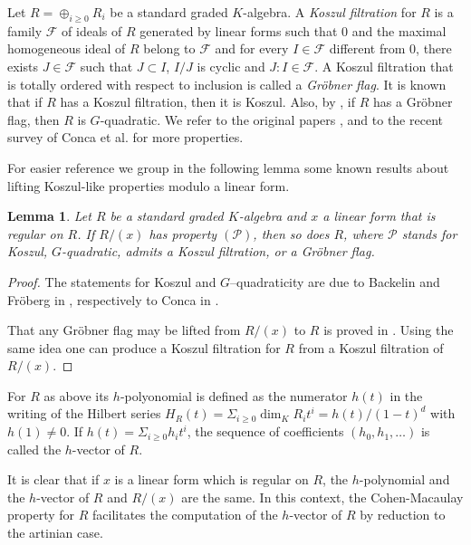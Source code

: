 \documentclass[12pt]{amsart}
\newtheorem{Lemma}[Theorem]{Lemma}
\begin{document}
Let $R=\oplus_{i\geq 0} R_i$  be a  standard graded $K$-algebra.
A {\em Koszul filtration}  for $R$  is a family $\mathcal{F}$ of ideals of $R$ generated by linear forms such that $0$ and 
the maximal homogeneous ideal of $R$ belong to $\mathcal{F}$ and for every $I\in \mathcal{F}$ different from $0$, there exists $J \in \mathcal{F}$ such that
$J\subset I$, $I/J$ is cyclic and $J:I \in \mathcal{F}$. A Koszul filtration that is totally ordered with respect to inclusion is called a {\em Gr\"obner flag}.
It is known that if $R$ has a Koszul filtration, then it is Koszul. Also, by \cite[Theorem 2.4]{CRV}, if $R$ has a Gr\"obner flag, then $R$ is $G$-quadratic.
We refer to the original papers  \cite{CTV}, \cite{CRV} and to the recent survey \cite{CdNR} of Conca et al.  for more properties.

For easier reference we group in the following lemma some known results about lifting Koszul-like properties modulo a linear form. 

\begin{Lemma}
\label{lemma:lifting}
Let $R$ be a standard graded $K$-algebra and $x$ a linear form that is regular on $R$. If $R/(x)$ has  property $(\mathcal{P})$, then so does $R$, where
$\mathcal{P}$ stands for Koszul, $G$-quadratic, admits a Koszul filtration, or a Gr\"obner flag.  
\end{Lemma}

\begin{proof} The statements for Koszul and $G$--quadraticity are due to Backelin and Fr\"oberg in \cite[Lemma 2]{BF-poincare}, respectively to Conca in 
\cite[Lemma 4.(2)]{Conca-quadrics}. 

That any Gr\"obner flag may be lifted from $R/(x)$ to $R$ is proved in \cite[Lemma 2.11.(a)]{CRV}. Using the same idea one can
produce a  Koszul filtration for $R$ from a Koszul filtration of  $R/(x)$.
\end{proof}



For $R$ as above its $h$-polyonomial is defined as the numerator $h(t)$ in the writing of the Hilbert series
$H_R(t)=\Sigma_{i\geq 0} \dim_K R_i t^i= h(t)/(1-t)^d$ with $h(1)\neq 0$. If $h(t)=\Sigma_{i\geq 0}h_i t^i$,  the sequence of coefficients $(h_0, h_1, \dots)$ is called  the $h$-vector of $R$.

It is clear that if $x$ is a linear form which is regular on $R$, the $h$-polynomial and the $h$-vector of $R$ and $R/(x)$ are the same.
In this context, the Cohen-Macaulay property for $R$ facilitates the computation of the $h$-vector of $R$ by reduction to the artinian case.
\end{document}
